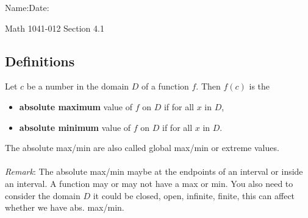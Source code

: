 \documentclass[10pt]{book}
\theoremstyle{definition}
\begin{document}
\begin{flushleft}
Name:\underline{\hspace{13cm}}Date:\underline{\hspace{2cm}}
\end{flushleft}
\begin{center}
{\Large Math 1041-012 \hspace{0.5cm} Section 4.1}
\end{center}

\begin{tcolorbox}
\subsection*{Definitions}
Let $c$ be a number in the domain $D$ of a function $f$. Then $f(c)$ is the
\begin{itemize}
    \item \textbf{absolute maximum} value of $f$ on $D$ if \underline{\hspace{3cm}} for all $x$ in $D$,
    \item \textbf{absolute minimum} value of $f$ on $D$ if \underline{\hspace{3cm}} for all $x$ in $D$.
\end{itemize}
The absolute max/min are also called global max/min or extreme values.\\ \\
\textit{Remark}: The absolute max/min maybe at the endpoints of an interval or inside an interval. A function may or may not have a max or min. You also need to consider the domain $D$ it could be closed, open, infinite, finite, this can affect whether we have abs. max/min.
\end{tcolorbox}
\end{document}
